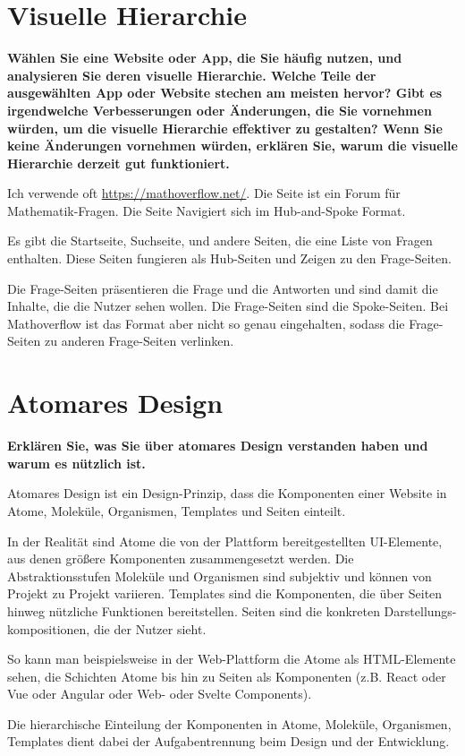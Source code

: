 \documentclass[a4paper,12pt]{article}
\begin{document}
\section{Visuelle Hierarchie}
\textbf{Wählen Sie eine Website oder App, die Sie häufig nutzen, und
  analysieren Sie deren visuelle Hierarchie. Welche Teile der ausgewählten App oder
  Website stechen am meisten hervor? Gibt es irgendwelche Verbesserungen oder
  Änderungen, die Sie vornehmen würden, um die visuelle Hierarchie effektiver zu
  gestalten? Wenn Sie keine Änderungen vornehmen würden, erklären Sie, warum die
  visuelle Hierarchie derzeit gut funktioniert.}

Ich verwende oft \url{https://mathoverflow.net/}. Die Seite ist ein Forum für
Mathematik-Fragen. Die Seite Navigiert sich im Hub-and-Spoke Format.

Es gibt die Startseite, Suchseite, und andere Seiten, die eine Liste von Fragen
enthalten. Diese Seiten fungieren als Hub-Seiten und Zeigen zu den Frage-Seiten.

Die Frage-Seiten präsentieren die Frage und die Antworten und sind damit die Inhalte, die
die Nutzer sehen wollen. Die Frage-Seiten sind die Spoke-Seiten. Bei Mathoverflow
ist das Format aber nicht so genau eingehalten, sodass die Frage-Seiten zu anderen
Frage-Seiten verlinken.

\section{Atomares Design}

\textbf{Erklären Sie, was Sie über atomares Design verstanden haben
  und warum es nützlich ist.}

Atomares Design ist ein Design-Prinzip, dass die Komponenten einer Website
in Atome, Moleküle, Organismen, Templates und Seiten einteilt.

In der Realität sind Atome die von der Plattform bereitgestellten UI-Elemente,
aus denen größere Komponenten zusammengesetzt werden. Die Abstraktionsstufen Moleküle
und Organismen sind subjektiv und können von Projekt zu Projekt variieren. Templates
sind die Komponenten, die über Seiten hinweg nützliche Funktionen bereitstellen. Seiten
sind die konkreten Darstellungs-kompositionen, die der Nutzer sieht.

So kann man beispielsweise in der Web-Plattform die Atome als HTML-Elemente sehen,
die Schichten Atome bis hin zu Seiten als Komponenten
(z.B. React oder Vue oder Angular oder Web- oder Svelte Components).

Die hierarchische Einteilung der Komponenten in Atome, Moleküle, Organismen, Templates
dient dabei der Aufgabentrennung beim Design und der Entwicklung.
\end{document}
